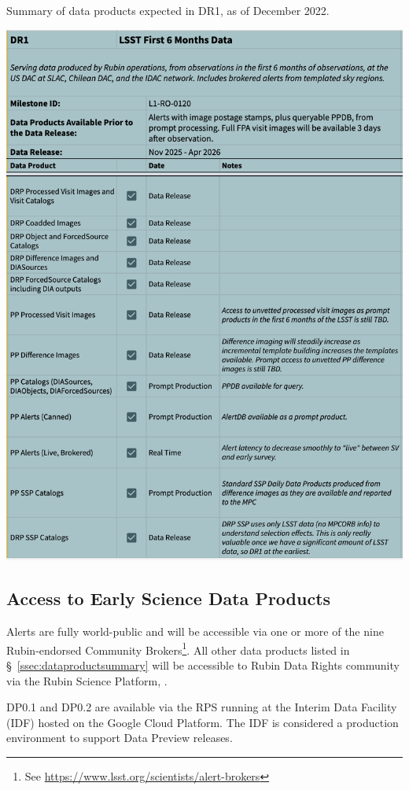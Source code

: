 \begin{table}
\caption{Summary of data products expected in DR1, as of December 2022.}
\label{tab:dr-one-products}
\includegraphics[width=\linewidth]{figures/DR1-products}
\end{table}


\subsection{Access to Early Science  Data Products} \label{ssec:dataaccess}
Alerts are fully world-public and will be accessible via one or more of the nine Rubin-endorsed Community Brokers\footnote{See \url{https://www.lsst.org/scientists/alert-brokers}}.
All other data products listed in \S~\ref{ssec:dataproductsummary} will be accessible to Rubin Data Rights community via the Rubin Science Platform, \citep{LSE-319}.

DP0.1 and DP0.2 are available via the RPS running at the Interim Data Facility (IDF) hosted on the Google Cloud Platform.
The IDF is considered a production environment to support Data Preview releases. 

